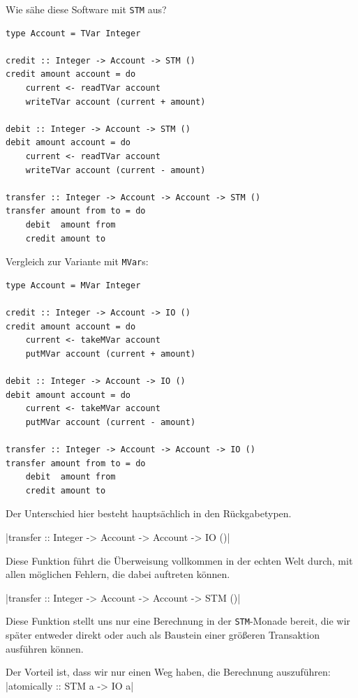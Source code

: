 \documentclass{beamer}
\begin{document}

\begin{frame}[fragile]

Wie sähe diese Software mit \texttt{STM} aus?

\begin{verbatim}
type Account = TVar Integer
 
credit :: Integer -> Account -> STM ()
credit amount account = do
    current <- readTVar account
    writeTVar account (current + amount)
 
debit :: Integer -> Account -> STM ()
debit amount account = do
    current <- readTVar account
    writeTVar account (current - amount)
 
transfer :: Integer -> Account -> Account -> STM ()
transfer amount from to = do
    debit  amount from
    credit amount to
\end{verbatim}
\end{frame}


\begin{frame}[fragile]

Vergleich zur Variante mit \texttt{MVar}s:

\begin{verbatim}
type Account = MVar Integer
 
credit :: Integer -> Account -> IO ()
credit amount account = do
    current <- takeMVar account
    putMVar account (current + amount)
 
debit :: Integer -> Account -> IO ()
debit amount account = do
    current <- takeMVar account
    putMVar account (current - amount)
 
transfer :: Integer -> Account -> Account -> IO ()
transfer amount from to = do
    debit  amount from
    credit amount to
\end{verbatim}
\end{frame}


\begin{frame}[fragile]

Der Unterschied hier besteht hauptsächlich in den Rückgabetypen.\pause

|transfer :: Integer -> Account -> Account -> IO ()|

Diese Funktion führt die Überweisung vollkommen in der echten Welt durch, mit allen
möglichen Fehlern, die dabei auftreten können.\pause

|transfer :: Integer -> Account -> Account -> STM ()|

Diese Funktion stellt uns nur eine Berechnung in der \texttt{STM}-Monade bereit, die wir
später entweder direkt oder auch als Baustein einer größeren Transaktion ausführen können.\pause\smallskip

Der Vorteil ist, dass wir nur einen Weg haben, die Berechnung auszuführen:
|atomically :: STM a -> IO a|
\end{frame}
\end{document}
